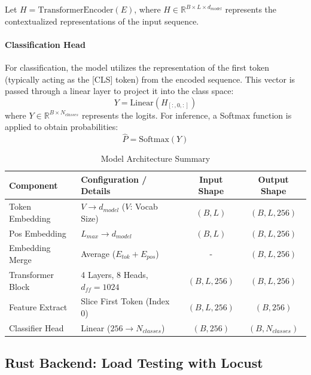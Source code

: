 \documentclass{ieeeaccess}
\begin{document}
Let $H = \text{TransformerEncoder}(E)$, where $H \in \mathbb{R}^{B \times L \times d_{model}}$ represents the contextualized representations of the input sequence.

\paragraph{Classification Head}
For classification, the model utilizes the representation of the first token (typically acting as the [CLS] token) from the encoded sequence. This vector is passed through a linear layer to project it into the class space:
\begin{equation}
    Y = \text{Linear}(H_{[:, 0, :]})
\end{equation}
where $Y \in \mathbb{R}^{B \times N_{classes}}$ represents the logits. For inference, a Softmax function is applied to obtain probabilities:
\begin{equation}
    \hat{P} = \text{Softmax}(Y)
\end{equation}

\begin{table}[t!]
\centering
\caption{Model Architecture Summary}
\label{tab:model_arch}
\begin{tabular}{|l|l|c|c|}
\hline
\textbf{Component} & \textbf{Configuration / Details} & \textbf{Input Shape} & \textbf{Output Shape} \\ \hline
Token Embedding & $V \to d_{model}$ ($V$: Vocab Size) & $(B, L)$ & $(B, L, 256)$ \\ \hline
Pos Embedding & $L_{max} \to d_{model}$ & $(B, L)$ & $(B, L, 256)$ \\ \hline
Embedding Merge & Average ($E_{tok} + E_{pos}$) & - & $(B, L, 256)$ \\ \hline
Transformer Block & 4 Layers, 8 Heads, $d_{ff}=1024$ & $(B, L, 256)$ & $(B, L, 256)$ \\ \hline
Feature Extract & Slice First Token (Index 0) & $(B, L, 256)$ & $(B, 256)$ \\ \hline
Classifier Head & Linear ($256 \to N_{classes}$) & $(B, 256)$ & $(B, N_{classes})$ \\ \hline
\end{tabular}
\end{table}



\subsection{Rust Backend: Load Testing with Locust}
\end{document}
